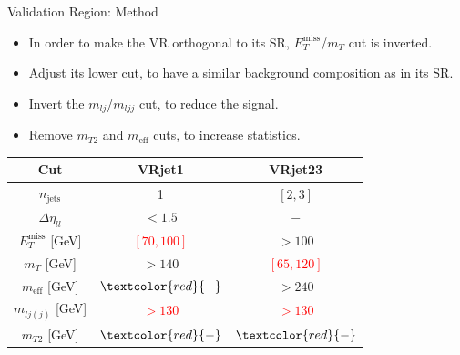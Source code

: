 \documentclass[mathserif,serif]{beamer}
\begin{document}
\begin{frame}{Validation Region: Method}
\begin{itemize}
\item In order to make the VR orthogonal to its SR, $E_T^{\text{miss}}$/$m_{T}$ cut is inverted.
\item Adjust its lower cut, to have a similar background composition as in its SR.
\item Invert the $m_{lj}$/$m_{ljj}$ cut, to reduce the signal.
\item Remove $m_{T2}$ and $m_{\text{eff}}$ cuts, to increase statistics.
\end{itemize}
\begin{table}[htbp]
\begin{center}
\begin{tabular}{|c|c|c|}
\hline
Cut & VRjet1 & VRjet23 \\
\hline
\hline
$n_{\text{jets}}$               & 1                             & $[2,3]$ \\
$\Delta \eta_{ll}$              & $<1.5$                        & $-$ \\
$E_T^{\text{miss}}$ [GeV]       & \textcolor{red}{ $[70,100]$ } & $>100$ \\
$m_T$ [GeV]                     & $>140$                        & \textcolor{red}{$[65,120]$} \\
$m_{\text{eff}}$ [GeV]          & $\textcolor{red}{-}$          & $>240$ \\
$m_{lj(j)}$ [GeV]               & \textcolor{red}{$>130$}       & \textcolor{red}{$>130$} \\
$m_{T2}$ [GeV]                  & $\textcolor{red}{-}$          & $\textcolor{red}{-}$ \\
\hline
\end{tabular}
\end{center}
\end{table}
\end{frame}
\end{document}
